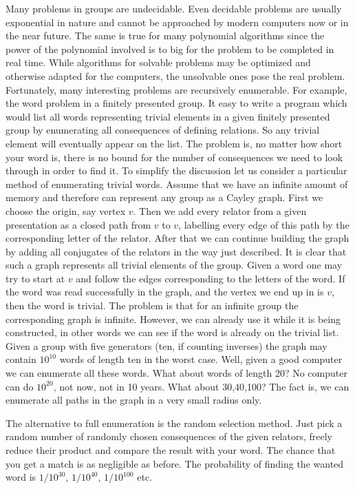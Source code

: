 \documentclass{article}
\begin{document}
Many problems in groups are undecidable. Even decidable problems are
usually exponential in nature and cannot be approached by modern
computers now or in the near future. The same is true for many
polynomial algorithms since the power of the polynomial involved is to
big for the problem to be completed in real time. While algorithms for
solvable problems may be optimized and otherwise adapted for the
computers, the unsolvable ones pose the real problem. Fortunately,
many interesting problems are recursively enumerable. For example, the
word problem in a finitely presented group. It easy to write a program
which would list all words representing trivial elements in a given
finitely presented group by enumerating all consequences of defining
relations. So any trivial element will eventually appear on the
list. The problem is, no matter how short your word is, there is no
bound for the number of consequences we need to look through in order
to find it. To simplify the discussion let us consider a particular
method of enumerating trivial words. Assume that we have an infinite
amount of memory and therefore can represent any group as a Cayley
graph. First we choose the origin, say vertex $v$. Then we add every
relator from a given presentation as a closed path from $v$ to $v$,
labelling every edge of this path by the corresponding letter of the
relator. After that we can continue building the graph by adding all
conjugates of the relators in the way just described. It is clear that
such a graph represents all trivial elements of the group. Given a
word one may try to start at $v$ and follow the edges corresponding to
the letters of the word. If the word was read successfully in the
graph, and the vertex we end up in is $v$, then the word is trivial.
The problem is that for an infinite group the corresponding graph is
infinite. However, we can already use it while it is being
constructed, in other words we can see if the word is already on the
trivial list. Given a group with five generators (ten, if counting
inverses) the graph may contain $10^{10}$ words of length ten in the
worst case. Well, given a good computer we can enumerate all these
words. What about words of length 20? No computer can do $10^{20}$,
not now, not in 10 years. What about 30,40,100? The fact is, we can
enumerate all paths in the graph in a very small radius only. 

The alternative to full enumeration is the random selection
method. Just pick a random number of randomly chosen consequences of
the given relators, freely reduce their product and compare the result
with your word. The chance that you get a match is as negligible as
before. The probability of finding the wanted word is $1/10^{30}$,
$1/10^{40}$, $1/10^{100}$ etc.
\end{document}
